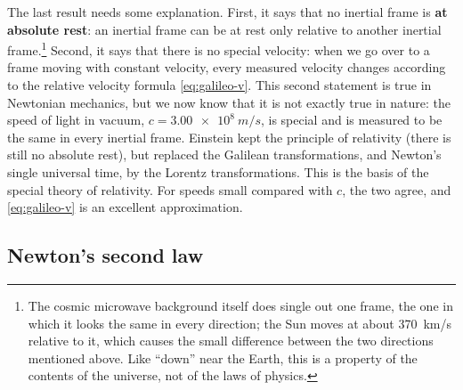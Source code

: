 \documentclass[11pt,a4paper]{article}
\begin{document}
The last result needs some explanation. First, it says that no inertial frame is \textbf{at
absolute rest}: an inertial frame can be at rest only relative to another inertial frame.\footnote{The
cosmic microwave background itself does single out one frame, the one in which it looks the same in
every direction; the Sun moves at about \qty{370}{km/s} relative to it, which causes the small
difference between the two directions mentioned above. Like ``down'' near the Earth, this is a
property of the contents of the universe, not of the laws of physics.} Second, it
says that there is no special velocity: when we go over to a frame moving with constant velocity,
every measured velocity changes according to the relative velocity formula \eqref{eq:galileo-v}.
This second statement is true in Newtonian mechanics, but we now know that it is not exactly true in
nature: the speed of light in vacuum, $c = \qty{3.00e8}{m/s}$, is special and is measured to be the
same in every inertial frame. Einstein kept the principle of relativity (there is still no absolute
rest), but replaced the Galilean transformations, and Newton's single universal time, by the
Lorentz transformations. This is the basis of the special theory of relativity. For speeds small
compared with $c$, the two agree, and \eqref{eq:galileo-v} is an excellent approximation.

\subsection{Newton's second law}\label{sec:second}
\end{document}
